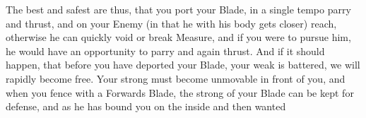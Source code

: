 The best and safest are thus, that you port your Blade, in a single
tempo parry and thrust, and on your Enemy (in that he with his body
gets closer) reach, otherwise he can quickly void or break Measure,
and if you were to pursue him, he would have an opportunity to parry
and again thrust. And if it should happen, that before you have
deported your Blade, your weak is battered, we will rapidly become
free. Your strong must become unmovable in front of you, and when you
fence with a Forwards Blade, the strong of your Blade can be kept for
defense, and as he has bound you on the inside and then wanted